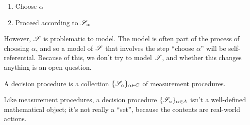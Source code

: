 \begin{enumerate}
    \item Choose $\alpha$
    \item Proceed according to $\mathscr{S}_\alpha$
\end{enumerate}

However, $\mathscr{S}$ is problematic to model. The model is often part of the process of choosing $\alpha$, and so a model of $\mathscr{S}$ that involves the step ``choose $\alpha$'' will be self-referential. Because of this, we don't try to model $\mathscr{S}$, and whether this changes anything is an open question.

\begin{definition}
A decision procedure is a collection $\{\mathscr{S}_\alpha\}_{\alpha\in C}$ of measurement procedures.
\end{definition}

Like measurement procedures, a decision procedure $\{\mathscr{S}_\alpha\}_{\alpha\in A}$ isn't a well-defined mathematical object; it's not really a ``set'', because the contents are real-world actions.